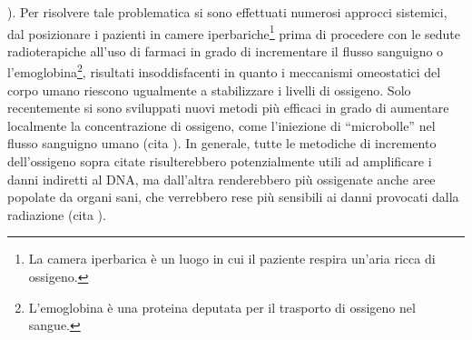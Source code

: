 \documentclass[12pt,a4paper,twoside]{report}
\begin{document}
	). Per risolvere tale problematica si sono effettuati numerosi approcci sistemici, dal posizionare i pazienti in camere iperbariche\footnote{La camera iperbarica è un luogo in cui il paziente respira un'aria ricca di ossigeno.} prima di procedere con le sedute radioterapiche all'uso di farmaci in grado di incrementare il flusso sanguigno o l'emoglobina\footnote{L'emoglobina è una proteina deputata per il trasporto di ossigeno nel sangue.}, risultati insoddisfacenti in quanto i meccanismi omeostatici del corpo umano riescono ugualmente a stabilizzare i livelli di ossigeno. Solo recentemente si sono sviluppati nuovi metodi più efficaci in grado di aumentare localmente la concentrazione di ossigeno, come l'iniezione di ``microbolle'' nel flusso sanguigno umano (cita
	). In generale, tutte le metodiche di incremento dell'ossigeno sopra citate risulterebbero potenzialmente utili ad amplificare i danni indiretti al DNA, ma dall'altra renderebbero più ossigenate anche aree popolate da organi sani, che verrebbero rese più sensibili ai danni provocati dalla radiazione (cita
	).
	
\end{document}
